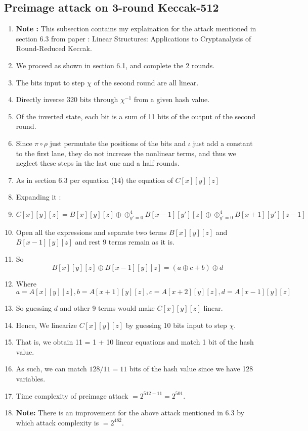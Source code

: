 \documentclass{article}
\begin{document}
\subsection{Preimage attack on 3-round Keccak-512}
\begin{enumerate}
    \item \textbf{Note :} This subsection contains my explaination for the attack mentioned in section 6.3 from paper : Linear Structures: Applications to Cryptanalysis
of Round-Reduced Keccak.
    \item We proceed as shown in section 6.1, and complete the 2 rounds.
    \item The bits input to step $\chi$ of the second round are all linear.
    \item Directly inverse 320 bits through $\chi^{-1}$ from a given hash value.
    \item Of the inverted state, each bit is a sum of 11 bits of the output of the second round.
    \item Since $\pi \circ \rho$ just permutate the positions of the bits and $\iota$ just add a constant to the first lane, they do not increase the nonlinear terms, and thus we neglect these steps in the last one and a half rounds.
    \item As in section 6.3 per equation (14) the equation of $C[x][y][z]$
    \item Expanding it :
    \item \[
        C[x][y][z] = B[x][y][z] \oplus \oplus_{y' = 0}^{4} B[x-1][y'][z] \oplus \oplus_{y' = 0}^{4} B[x+1][y'][z-1]
    \]
    \item Open all the expressions and separate two terms $B[x][y][z]$ and $B[x-1][y][z]$ and rest 9 terms remain as it is.
    \item So \[ B[x][y][z] \oplus B[x-1][y][z] = (a \oplus c + b) \oplus d
    \]
    \item Where \[
        a = A[x][y][z], b = A[x + 1][y][z], c = A[x + 2][y][z], d = A[x - 1][y][z]
    \]
    \item So guessing $d$ and other 9 terms would make $C[x][y][z]$ linear.
    \item Hence, We linearize $C[x][y][z]$ by guessing 10 bits input to step $\chi$.
    \item That is, we obtain 11 = 1 + 10 linear equations and match 1 bit of the hash value.
    \item As such, we can match $128/11 = 11$ bits of the hash value since we have 128 variables.
    \item Time complexity of preimage attack $= 2^{512 - 11} = 2^{501}$.
    \item \textbf{Note:} There is an improvement for the above attack mentioned in 6.3 by which attack complexity is $= 2^{482}$.
\end{enumerate}
\end{document}
